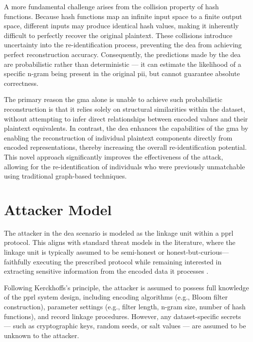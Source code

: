 A more fundamental challenge arises from the collision property of hash functions.
Because hash functions map an infinite input space to a finite output space, different inputs may produce identical hash values, making it inherently difficult to perfectly recover the original plaintext.
These collisions introduce uncertainty into the re-identification process, preventing the \ac{dea} from achieving perfect reconstruction accuracy.
Consequently, the predictions made by the \ac{dea} are probabilistic rather than deterministic — it can estimate the likelihood of a specific n-gram being present in the original \ac{pii}, but cannot guarantee absolute correctness.

The primary reason the \ac{gma} alone is unable to achieve such probabilistic reconstruction is that it relies solely on structural similarities within the dataset, without attempting to infer direct relationships between encoded values and their plaintext equivalents.
In contrast, the \ac{dea} enhances the capabilities of the \ac{gma} by enabling the reconstruction of individual plaintext components directly from encoded representations, thereby increasing the overall re-identification potential.
This novel approach significantly improves the effectiveness of the attack, allowing for the re-identification of individuals who were previously unmatchable using traditional graph-based techniques.


\section{Attacker Model}

The attacker in the \ac{dea} scenario is modeled as the linkage unit within a \ac{pprl} protocol.
This aligns with standard threat models in the literature, where the linkage unit is typically assumed to be semi-honest or honest-but-curious—faithfully executing the prescribed protocol while remaining interested in extracting sensitive information from the encoded data it processes \cite{schnell2009privacy, vatsalan2017privacy}.

Following Kerckhoffs’s principle, the attacker is assumed to possess full knowledge of the \ac{pprl} system design, including encoding algorithms (e.g., Bloom filter construction), parameter settings (e.g., filter length, n-gram size, number of hash functions), and record linkage procedures.
However, any dataset-specific secrets — such as cryptographic keys, random seeds, or salt values — are assumed to be unknown to the attacker.

